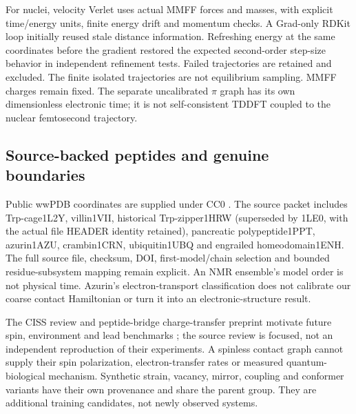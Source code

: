 \documentclass[11pt,oneside,openany]{book}
\theoremstyle{definition}\newtheorem{definition}[theorem]{Definition}
\theoremstyle{remark}\newtheorem{remark}[theorem]{Remark}
\begin{document}
For nuclei, velocity Verlet uses actual MMFF forces and masses, with explicit
time/energy units, finite energy drift and momentum checks. A Grad-only RDKit
loop initially reused stale distance information. Refreshing energy at the same
coordinates before the gradient restored the expected second-order step-size
behavior in independent refinement tests. Failed trajectories are retained and
excluded. The finite isolated trajectories are not equilibrium sampling.
MMFF charges remain fixed. The separate uncalibrated $\pi$ graph has its own
dimensionless electronic time; it is not self-consistent TDDFT coupled to the
nuclear femtosecond trajectory.

\subsection{Source-backed peptides and genuine boundaries}
Public wwPDB coordinates are supplied under CC0 \cite{DSPDB}. The source packet
includes Trp-cage1L2Y, villin1VII, historical Trp-zipper1HRW (superseded by
1LE0, with the actual file HEADER identity retained), pancreatic polypeptide1PPT,
azurin1AZU, crambin1CRN, ubiquitin1UBQ and engrailed homeodomain1ENH.
The full source file, checksum, DOI, first-model/chain selection and bounded
residue-subsystem mapping remain explicit. An NMR ensemble's model order is
not physical time. Azurin's electron-transport classification does not calibrate
our coarse contact Hamiltonian or turn it into an electronic-structure result.

The CISS review and peptide-bridge charge-transfer preprint motivate future
spin, environment and lead benchmarks \cite{DSCISS,DSBridge}; the source review is
focused, not an independent reproduction of their experiments. A spinless
contact graph cannot supply their spin polarization, electron-transfer rates
or measured quantum-biological mechanism. Synthetic strain, vacancy, mirror,
coupling and conformer variants have their own provenance and share the parent
group. They are additional training candidates, not newly observed systems.
\end{document}
